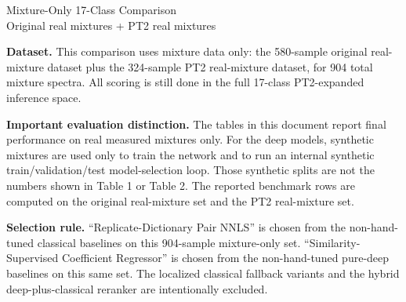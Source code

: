 \documentclass[11pt]{article}
\begin{document}
\begin{center}
{\LARGE Mixture-Only 17-Class Comparison}\\[0.4em]
{\large Original real mixtures + PT2 real mixtures}
\end{center}

\textbf{Dataset.} This comparison uses mixture data only: the 580-sample original real-mixture dataset plus the 324-sample PT2 real-mixture dataset, for 904 total mixture spectra. All scoring is still done in the full 17-class PT2-expanded inference space.

\textbf{Important evaluation distinction.} The tables in this document report final performance on real measured mixtures only. For the deep models, synthetic mixtures are used only to train the network and to run an internal synthetic train/validation/test model-selection loop. Those synthetic splits are not the numbers shown in Table 1 or Table 2. The reported benchmark rows are computed on the original real-mixture set and the PT2 real-mixture set.

\textbf{Selection rule.} ``Replicate-Dictionary Pair NNLS'' is chosen from the non-hand-tuned classical baselines on this 904-sample mixture-only set. ``Similarity-Supervised Coefficient Regressor'' is chosen from the non-hand-tuned pure-deep baselines on this same set. The localized classical fallback variants and the hybrid deep-plus-classical reranker are intentionally excluded.

\begin{table}[ht]
\centering
\caption{Full 17-class mixture-only comparison across original and PT2 real mixtures.}
\small
{}
\end{table}
\end{document}
